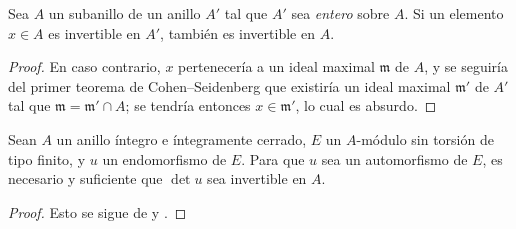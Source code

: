 \documentclass[oneside,10pt]{amsart}
\let\EGAOriginalLabel\label
\renewcommand{\label}[1]{\phantomsection\EGAOriginalLabel{#1}}
\begin{document}
\begin{lemma}[6.4.5.1]
\label{II.6.4.5.1-fr}
Sea $A$ un subanillo de un anillo $A'$ tal que $A'$ sea \emph{entero} sobre $A$.
Si un elemento $x\in A$ es invertible en $A'$, también es invertible en $A$.
\end{lemma}

\begin{proof}
En caso contrario, $x$ pertenecería a un ideal maximal $\mathfrak{m}$ de $A$, y se seguiría del primer teorema de Cohen--Seidenberg \cite[t.~I, p.~257, th.~3]{I-13} que existiría un ideal maximal $\mathfrak{m}'$ de $A'$ tal que $\mathfrak{m}=\mathfrak{m}'\cap A$;
se tendría entonces $x\in\mathfrak{m}'$, lo cual es absurdo.
\end{proof}

\begin{corollary}[6.4.6]
\label{II.6.4.6-fr}
Sean $A$ un anillo íntegro e íntegramente cerrado, $E$ un $A$-módulo sin torsión de tipo finito, y $u$ un endomorfismo de $E$.
Para que $u$ sea un automorfismo de $E$, es necesario y suficiente que $\det u$ sea invertible en $A$.
\end{corollary}

\begin{proof}
Esto se sigue de  y .
\end{proof}
\end{document}
